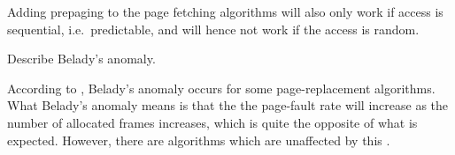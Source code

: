 \documentclass[a4paper]{miunasgn}
\begin{document}
\begin{questions}
\begin{solution}
		Adding prepaging to the page fetching algorithms will also only work if 
		access is sequential, i.e.\ predictable, and will hence not work if the 
		access is random.
	\end{solution}

	\question\label{q:belady}
	Describe Belady's anomaly.
	\begin{solution}
		According to \citet[p. 374]{Silberschatz2009osc}, Belady's anomaly occurs 
		for some page-replacement algorithms.
		What Belady's anomaly means is that the the page-fault rate will increase 
		as the number of allocated frames increases, which is quite the opposite of 
		what is expected.
		However, there are algorithms which are unaffected by this \citep[e.g. OPT, 
		section 9.4.3]{Silberschatz2009osc}.
	\end{solution}
\end{questions}






\end{document}
